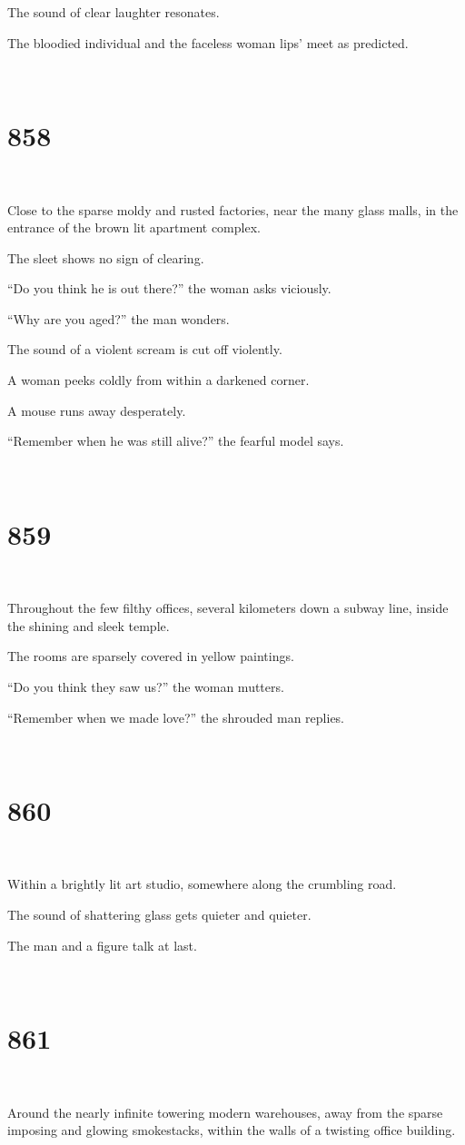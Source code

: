 \documentclass{report}
\begin{document}
The sound of clear laughter resonates.

The bloodied individual and the faceless woman lips' meet as predicted.

~
\chapter*{858}
~

Close to the sparse moldy and rusted factories, near the many glass malls, in the entrance of the brown lit apartment complex.

The sleet shows no sign of clearing.

``Do you think he is out there?'' the woman asks viciously.

``Why are you aged?'' the man wonders.

The sound of a violent scream is cut off violently.

A woman peeks coldly from within a darkened corner.

A mouse runs away desperately.

``Remember when he was still alive?'' the fearful model says.

~
\chapter*{859}
~

Throughout the few filthy offices, several kilometers down a subway line, inside the shining and sleek temple.

The rooms are sparsely covered in yellow paintings.

``Do you think they saw us?'' the woman mutters.

``Remember when we made love?'' the shrouded man replies.

~
\chapter*{860}
~

Within a brightly lit art studio, somewhere along the crumbling road.

The sound of shattering glass gets quieter and quieter.

The man and a figure talk at last.

~
\chapter*{861}
~

Around the nearly infinite towering modern warehouses, away from the sparse imposing and glowing smokestacks, within the walls of a twisting office building.
\end{document}
